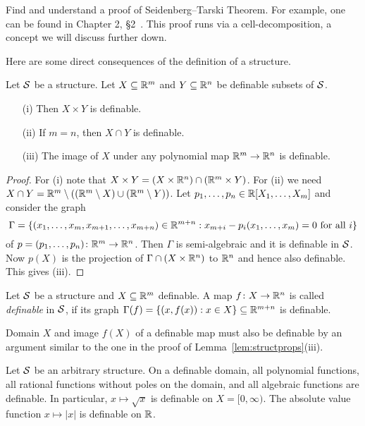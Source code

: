 \begin{exercise}
  Find and understand a proof of Seidenberg--Tarski Theorem. For
  example, one can be found in Chapter 2, \S 2~\cite{D:oMin}. This
  proof runs via a cell-decomposition, a concept we will discuss
  further down. 
\end{exercise}

Here are some direct consequences of the definition of a structure.  

\begin{lemma}
  \label{lem:structprops}
  Let ${\mathcal S}$ be a structure. Let $X\subseteq{\mathbb{R}}^m$ and $Y\subseteq{\mathbb{R}}^n$ be definable subsets of ${\mathcal S}$.
  \begin{enumerate}   
  \item [(i)] Then $X\times Y$ is definable.
  \item[(ii)] If $m=n$, then $X\cap Y$ is definable.
  \item[(iii)] The image of $X$ under any polynomial map
    ${\mathbb{R}}^m\rightarrow {\mathbb{R}}^n$ is definable. 
  \end{enumerate}
\end{lemma}
\begin{proof}
  For (i) note that $X\times Y =  (X\times {\mathbb{R}}^n)\cap ({\mathbb{R}}^m\times
  Y)$. For (ii) we need $X\cap Y = {\mathbb{R}}^m\setminus (({\mathbb{R}}^m\setminus X)\cup ({\mathbb{R}}^m
  \setminus Y))$.
  Let $p_1,\ldots,p_n\in{\mathbb{R}}[X_1,\ldots,X_m]$ and consider the graph
  \begin{equation*}
    \Gamma = \{(x_1,\ldots,x_m,x_{m+1},\ldots,x_{m+n})\in{\mathbb{R}}^{m+n} :
    x_{m+i}-p_i(x_1,\ldots,x_m)= 0 \text{ for all }
    i\} 
  \end{equation*}
  of $p=(p_1,\ldots,p_n)\colon {\mathbb{R}}^m\rightarrow{\mathbb{R}}^n$. Then $\Gamma$ is
  semi-algebraic and it is definable in ${\mathcal S}$. Now $p(X)$ is the
  projection of $\Gamma \cap (X\times{\mathbb{R}}^n)$ to ${\mathbb{R}}^n$ and hence also
  definable. This gives (iii). 
\end{proof}

\begin{definition}
  Let ${\mathcal S}$ be a structure and $X\subseteq{\mathbb{R}}^m$ definable.
  A map $f\colon X\rightarrow{\mathbb{R}}^n$ is
  called \emph{definable} in ${\mathcal S}$, if its graph $\Gamma(f) =
  \{(x,f(x)) : x\in X\}\subseteq{\mathbb{R}}^{m+n}$ is definable.
\end{definition}

Domain $X$ and image $f(X)$ of a definable map must also be definable
by an argument similar to the one in the proof of Lemma~\ref{lem:structprops}(iii).

\begin{example}
  Let ${\mathcal S}$ be an arbitrary structure. 
  On a definable domain, 
  all polynomial functions, all rational functions without poles on the
  domain, and all algebraic functions are definable.
  In particular, $x\mapsto \sqrt{x}$ is definable on $X=[0,\infty)$.
  The absolute value function $x\mapsto |x|$ is definable on ${\mathbb{R}}$.
\end{example}



